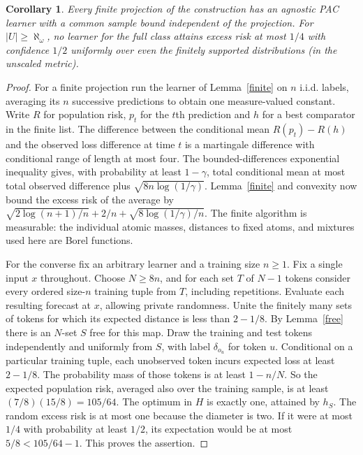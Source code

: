 \documentclass[11pt]{article}
\newtheorem{corollary}[theorem]{Corollary}
\begin{document}
\begin{corollary}\label{pac}
Every finite projection of the construction has an agnostic PAC learner with a common sample bound independent of the projection. For $|U|\ge\aleph_\omega$, no learner for the full class attains excess risk at most $1/4$ with confidence $1/2$ uniformly over even the finitely supported distributions (in the unscaled metric).
\end{corollary}
\begin{proof}
For a finite projection run the learner of Lemma~\ref{finite} on $n$ i.i.d. labels, averaging its $n$ successive predictions to obtain one measure-valued constant. Write $R$ for population risk, $p_t$ for the $t$th prediction and $h$ for a best comparator in the finite list. The difference between the conditional mean $R(p_t)-R(h)$ and the observed loss difference at time $t$ is a martingale difference with conditional range of length at most four. The bounded-differences exponential inequality gives, with probability at least $1-\gamma$, total conditional mean at most total observed difference plus $\sqrt{8n\log(1/\gamma)}$. Lemma~\ref{finite} and convexity now bound the excess risk of the average by $\sqrt{2\log(n+1)/n}+2/n+\sqrt{8\log(1/\gamma)/n}$. The finite algorithm is measurable: the individual atomic masses, distances to fixed atoms, and mixtures used here are Borel functions.

For the converse fix an arbitrary learner and a training size $n\ge1$. Fix a single input $x$ throughout. Choose $N\ge8n$, and for each set $T$ of $N-1$ tokens consider every ordered size-$n$ training tuple from $T$, including repetitions. Evaluate each resulting forecast at $x$, allowing private randomness. Unite the finitely many sets of tokens for which its expected distance is less than $2-1/8$. By Lemma~\ref{free} there is an $N$-set $S$ free for this map. Draw the training and test tokens independently and uniformly from $S$, with label $\delta_{o_u}$ for token $u$. Conditional on a particular training tuple, each unobserved token incurs expected loss at least $2-1/8$. The probability mass of those tokens is at least $1-n/N$. So the expected population risk, averaged also over the training sample, is at least $(7/8)(15/8)=105/64$. The optimum in $H$ is exactly one, attained by $h_S$. The random excess risk is at most one because the diameter is two. If it were at most $1/4$ with probability at least $1/2$, its expectation would be at most $5/8<105/64-1$. This proves the assertion.
\end{proof}
\end{document}
